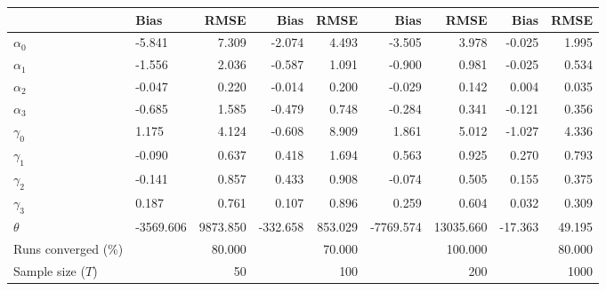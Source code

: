 
\begin{tabular}[t]{llrrrrrrr}
\toprule
  & Bias & RMSE & Bias & RMSE & Bias & RMSE & Bias & RMSE\\
\midrule
$\alpha_{0}$ & -5.841 & 7.309 & -2.074 & 4.493 & -3.505 & 3.978 & -0.025 & 1.995\\
$\alpha_{1}$ & -1.556 & 2.036 & -0.587 & 1.091 & -0.900 & 0.981 & -0.025 & 0.534\\
$\alpha_{2}$ & -0.047 & 0.220 & -0.014 & 0.200 & -0.029 & 0.142 & 0.004 & 0.035\\
$\alpha_{3}$ & -0.685 & 1.585 & -0.479 & 0.748 & -0.284 & 0.341 & -0.121 & 0.356\\
$\gamma_{0}$ & 1.175 & 4.124 & -0.608 & 8.909 & 1.861 & 5.012 & -1.027 & 4.336\\
$\gamma_{1}$ & -0.090 & 0.637 & 0.418 & 1.694 & 0.563 & 0.925 & 0.270 & 0.793\\
$\gamma_{2}$ & -0.141 & 0.857 & 0.433 & 0.908 & -0.074 & 0.505 & 0.155 & 0.375\\
$\gamma_{3}$ & 0.187 & 0.761 & 0.107 & 0.896 & 0.259 & 0.604 & 0.032 & 0.309\\
$\theta$ & -3569.606 & 9873.850 & -332.658 & 853.029 & -7769.574 & 13035.660 & -17.363 & 49.195\\
Runs converged (\%) &  & 80.000 &  & 70.000 &  & 100.000 &  & 80.000\\
Sample size ($T$) &  & 50 &  & 100 &  & 200 &  & 1000\\
\bottomrule
\end{tabular}
